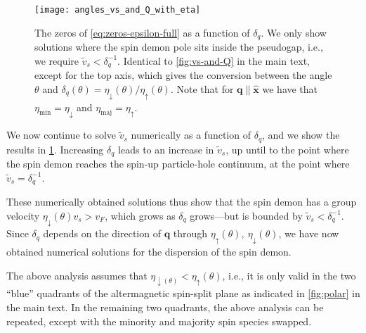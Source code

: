 \documentclass[aps,prb,reprint,twocolumns,superscriptaddress,nofootinbib]{revtex4-2}
\newcommand{\pg}[1]{\textcolor{red}{PG: #1}}
\newcommand{\xx}{\hat{\bm{x}}}
\begin{document}
	\begin{figure}
		\texttt{[image: angles\_vs\_and\_Q\_with\_eta]}
		\caption{The zeros of \cref{eq:zeros-epsilon-full} as a function of $\delta_q$. We only show solutions where the spin demon pole sits inside the pseudogap, i.e., we require $\tilde v_s<\delta_q^{-1}$. Identical to \cref{fig:vs-and-Q} in the main text, except for the top axis, which gives the conversion between the angle $\theta$ and $\delta_q(\theta)=\eta_\downarrow(\theta)/\eta_\uparrow(\theta)$.
			Note that for $\bm q\parallel\xx$ we have that $\eta_{\mathrm{min}}=\eta_{\downarrow}$ and $\eta_{\mathrm{maj}}=\eta_{\uparrow}$. \label{fig:vs-poles}}
	\end{figure}
	
	
	
	
	
	
	We now continue to solve  $\tilde v_s$ numerically as a function of $\delta_q$, and we show the results in \cref{fig:vs-poles}.  Increasing $\delta_q$ leads to an increase in $\tilde v_s$, up until to the point where the spin demon reaches the spin-up particle-hole continuum, at the point where  $\tilde v_s=\delta_q^{-1}$.
	
	These numerically obtained solutions thus show that the spin demon has a group velocity $\eta_{\downarrow}(\theta)v_s>v_F$, which grows as $\delta_q$ grows---but is bounded by $\tilde v_s < \delta_q^{-1}$. 
	Since $\delta_q$ depends on the direction of $\bm q$ through $\eta_\uparrow(\theta),\ \eta_\downarrow(\theta)$, we have now obtained numerical solutions for the dispersion of the spin demon. 
	
	The above analysis assumes that $\eta_{\downarrow(\theta)}<\eta_{\uparrow}(\theta)$, i.e., it is only valid in the two ``blue'' quadrants of the altermagnetic spin-split plane as indicated in \cref{fig:polar} in the main text. In the remaining two quadrants, the above analysis can be repeated, except with the minority and majority spin species swapped. 
	
\end{document}
